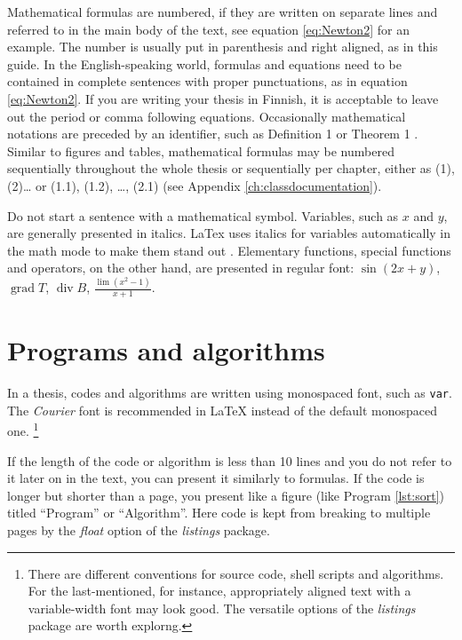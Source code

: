 \documentclass[twoside,draftfooter]{tutthesis} %
\begin{document}

Mathematical formulas are numbered, if they are written on separate lines and referred to in the main body of the text, see equation \eqref{eq:Newton2} for an example.
The number is usually put in parenthesis and right aligned, as in this guide.
In the English-speaking world, formulas and equations need to be contained in complete sentences with proper punctuations, as in equation \eqref{eq:Newton2}.
If you are writing your thesis in Finnish, it is acceptable to leave out the period or comma following equations.
Occasionally mathematical notations are preceded by an identifier, such as Definition 1 or Theorem 1 \citep{Ruohonen2009}.
Similar to figures and tables, mathematical formulas may be numbered sequentially throughout the whole thesis or sequentially per chapter, either as (1), (2)… or (1.1), (1.2), \ldots, (2.1) (see Appendix \ref{ch:classdocumentation}).

Do not start a sentence with a mathematical symbol.
Variables, such as $x$ and $y$, are generally presented in italics.
LaTex uses italics for variables automatically in the math mode to make them stand out \citep{Oetiker2011}.
Elementary functions, special functions and operators, on the other hand, are presented in regular font: $\sin (2x+y)$, $\operatorname{grad} T$, $\operatorname{div} B$, $\frac{\lim (x^2 - 1)}{x + 1}$.


\section{Programs and algorithms}

In a thesis, codes and algorithms are written using monospaced font, such as \texttt{var}.
The \emph{Courier} font is recommended in LaTeX instead of the default monospaced one.
\footnote{There are different conventions for source code, shell scripts and algorithms.
  For the last-mentioned, for instance, appropriately aligned text with a variable-width font may look good.
  The versatile options of the \emph{listings} package are worth explorng.}

If the length of the code or algorithm is less than 10 lines and you do not refer to it later on in the text, you can present it similarly to formulas.
If the code is longer but shorter than a page, you present like a figure (like Program \ref{lst:sort}) titled ``Program'' or ``Algorithm''.
Here code is kept from breaking to multiple pages by the \emph{float} option of the \emph{listings} package.
\end{document}
